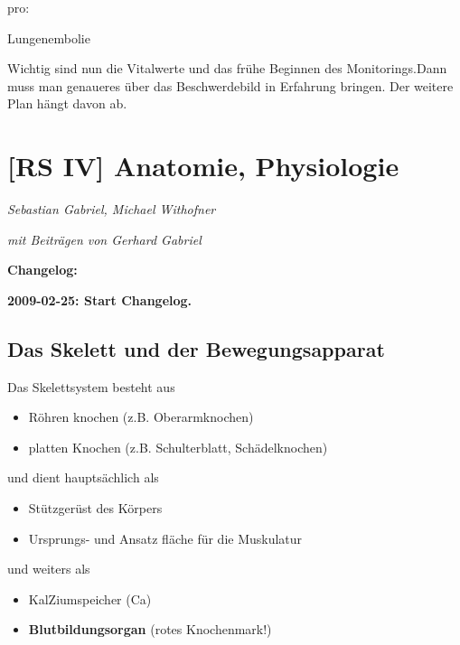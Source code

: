 \documentclass{article}
\newcommand\gEs[1]{\textbf{\textcolor[rgb]{0.0,0.0,0.5019608}{#1}}}
\newcommand\gEs[1]{\textbf{\textcolor[rgb]{0.0,0.0,0.5019608}{#1}}}
\begin{document}
pro:

Lungenembolie 

Wichtig sind nun die Vitalwerte und das fr\"uhe Beginnen des
Monitorings.Dann muss man genaueres \"uber das Beschwerdebild in
Erfahrung bringen. Der weitere Plan h\"angt davon ab.

\section{[RS IV] Anatomie, Physiologie}
{\mdseries\itshape
Sebastian Gabriel, Michael Withofner}

{\mdseries\itshape
mit Beitr\"agen von Gerhard Gabriel}

{\bfseries\color[rgb]{0.5019608,0.0,0.0}
\gEs{Changelog:}}

{\bfseries\color[rgb]{0.5019608,0.0,0.0}
2009-02-25: Start Changelog.}

\subsection{Das Skelett und der Bewegungsapparat}
{\mdseries
Das Skelettsystem besteht aus}

\begin{itemize}
\item R\"ohren knochen (z.B. Oberarmknochen)

\item platten  Knochen (z.B. Schulterblatt,  Sch\"adelknochen)

\end{itemize}
{\mdseries
und dient  haupts\"achlich als}

\begin{itemize}
\item St\"utzger\"ust  des K\"orpers

\item Ursprungs-  und Ansatz fl\"ache f\"ur die Muskulatur

\end{itemize}
{\mdseries
und weiters als}

\begin{itemize}
\item KalZiumspeicher (Ca)

\item \textbf{Blutbildungsorgan} (rotes Knochenmark!)

\end{itemize}
\end{document}
